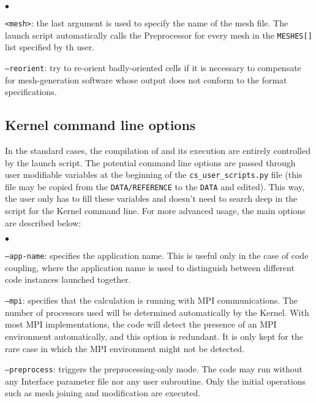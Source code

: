 {{{\begin{list}{$\bullet$}{}
\item \texttt{<mesh>}: the last argument is used to specify the name of the mesh file.
The launch script automatically calls the Preprocessor for every
mesh in the \texttt{MESHES[]} list specified by th user.

\item \texttt{--reorient}: try to re-orient badly-oriented cells
if it is necessary to compensate for mesh-generation software
whose output does not conform to the format specifications.

\end{list}

\subsection{Kernel command line options}
\label{prg_optappelnoy}%
In the standard cases, the compilation of \CS and its execution are entirely
controlled by the launch script. The potential command line options are passed
through user modifiable variables at the beginning of the \texttt{cs\_user\_scripts.py} file
(this file may be copied from the \texttt{DATA/REFERENCE} to the \texttt{DATA} and edited). 
This way, the user only has to fill these variables and doesn't need
to search deep in the script for the Kernel command line. For more advanced
usage, the main options are described below:

\begin{list}{$\bullet$}{}
\item \texttt{--app-name}: specifies the application name. This is
useful only in the case of code coupling, where the application name
is used to distinguish between different code instances launched together.

\item \texttt{--mpi}: specifies that the calculation is running
with MPI communications. The number of processors used will be determined
automatically by the Kernel. With most MPI implementations, the
code will detect the presence of an MPI environment automatically, and
this option is redundant. It is only kept for the rare case in which the
MPI environment might not be detected.

\item \texttt{--preprocess}: triggers the preprocessing-only mode.
The code may run without any Interface parameter file nor any user subroutine.
Only the initial operations such as mesh joining and modification are
executed.


\end{list}}}}
